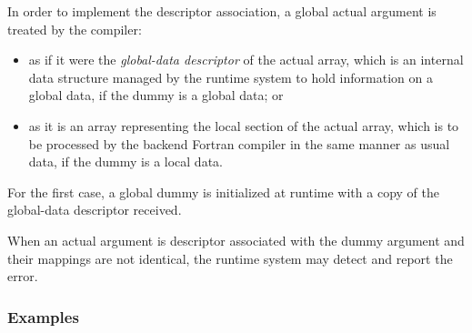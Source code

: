 In order to implement the descriptor association, a global actual
argument is treated by the {\XMP} compiler:

\begin{itemize}
 \item as if it were the {\it global-data descriptor} of the actual array, 
       which is an internal data structure managed by the {\XMP} runtime
       system to hold information on a global data, if the dummy is a
       global data; or
 \item as it is an array representing the local section of the actual
       array, which is to be processed by the backend Fortran compiler
       in the same manner as usual data, if the dummy is a local data.
\end{itemize}

For the first case, a global dummy is initialized at runtime with a copy
of the global-data descriptor received.

When an actual argument is descriptor associated with the dummy argument
and their mappings are not identical, the {\XMP} runtime system may
detect and report the error.

\subsubsection*{Examples}

